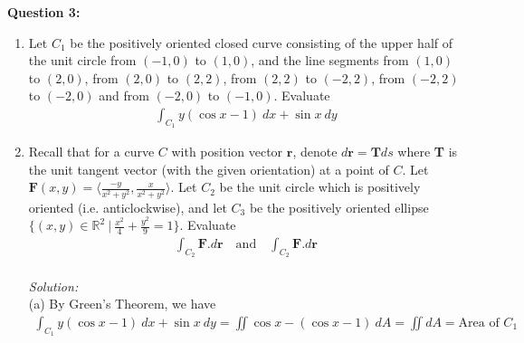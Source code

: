 \documentclass[12pt]{article}
\begin{document}
\textbf{Question 3:}
\begin{enumerate}[label=\alph*)]
    \item Let $C_1$ be the positively oriented closed curve consisting of the upper half of the unit circle from $(-1,0)$ to $(1,0)$, and the line segments from $(1,0)$ to $(2,0)$, from $(2,0)$ to $(2,2)$, from $(2,2)$ to $(-2,2)$, from $(-2,2)$ to $(-2,0)$ and from $(-2,0)$ to $(-1,0)$. Evaluate
    \begin{align*}
        \int_{C_1} y(\cos x-1)\ dx+\sin x\ dy
    \end{align*}
    \item Recall that for a curve $C$ with position vector $\textbf{r}$, denote $d\textbf{r}=\textbf{T}ds$ where \textbf{T} is the unit tangent vector (with the given orientation) at a point of $C$. Let $\textbf{F}(x,y)=\langle \frac{-y}{x^2+y^2},\frac{x}{x^2+y^2}\rangle$. Let $C_2$ be the unit circle which is positively oriented (i.e. anticlockwise), and let $C_3$ be the positively oriented ellipse $\{(x,y)\in\mathbb{R}^2\ |\ \frac{x^2}{4}+\frac{y^2}{9}=1\}$. Evaluate
    \begin{align*}
        \int_{C_2} \textbf{F}.d\textbf{r}\quad\text{and}\quad \int_{C_2}\textbf{F}.d\textbf{r}
    \end{align*}\\[2em]
    \emph{Solution:}\\
    (a) By Green's Theorem, we have
    \begin{align*}
        \int_{C_1} y(\cos x-1)\ dx+\sin x\ dy=\iint \cos x-(\cos x-1)\ dA=\iint dA=\text{Area of }C_1
    \end{align*}
\end{enumerate}
\begin{center}
\end{center}
\end{document}
